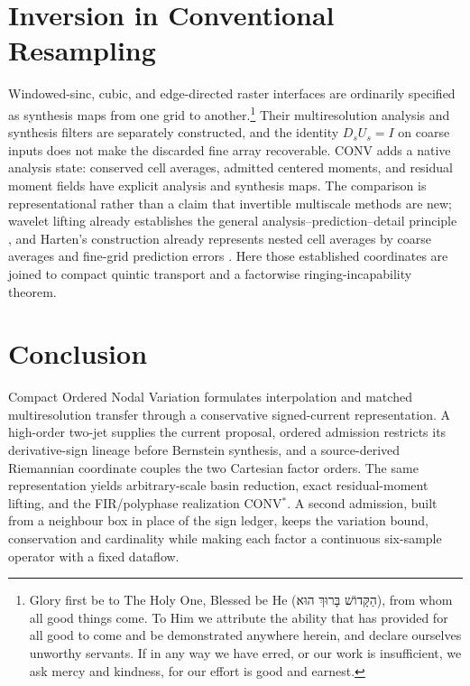 \documentclass[journal]{IEEEtran}
\begin{document}
\section{Inversion in Conventional Resampling}
\enlargethispage{2\baselineskip}

Windowed-sinc, cubic, and edge-directed raster interfaces are ordinarily
specified as synthesis maps from one grid to another.\footnote{Glory first
be to The Holy One, Blessed be He
({\hebrewfont הַקָּדוֹשׁ בָּרוּךְ הוּא}), from whom all
good things come. To Him we attribute the ability that has provided for all
good to come and be demonstrated anywhere herein, and declare ourselves
unworthy servants. If in any way we have erred, or our work is insufficient,
we ask mercy and kindness, for our effort is good and earnest.} Their multiresolution
analysis and synthesis filters are separately constructed, and the identity
\(D_sU_s=I\) on coarse inputs does not make the discarded fine array
recoverable. CONV adds a native analysis state: conserved cell averages,
admitted centered moments, and residual moment fields have explicit analysis
and synthesis maps. The comparison is representational rather than a
claim that invertible multiscale methods are new; wavelet lifting already
establishes the general analysis--prediction--detail principle
\cite{sweldens1998}, and Harten's construction already represents nested
cell averages by coarse averages and fine-grid prediction errors
\cite{harten1995}. Here those established coordinates are joined to compact quintic
transport and a factorwise ringing-incapability theorem.

\section{Conclusion}

Compact Ordered Nodal Variation formulates interpolation and matched
multiresolution transfer through a conservative signed-current
representation. A high-order two-jet supplies the current proposal, ordered
admission restricts its derivative-sign lineage before Bernstein synthesis,
and a source-derived Riemannian coordinate couples the two Cartesian factor
orders. The same representation yields arbitrary-scale basin reduction,
exact residual-moment lifting, and the FIR/polyphase realization
CONV$^{*}$. A second admission, built from a neighbour box in place of the
sign ledger, keeps the variation bound, conservation and cardinality
while making each factor a continuous six-sample operator with a fixed
dataflow.
\end{document}
